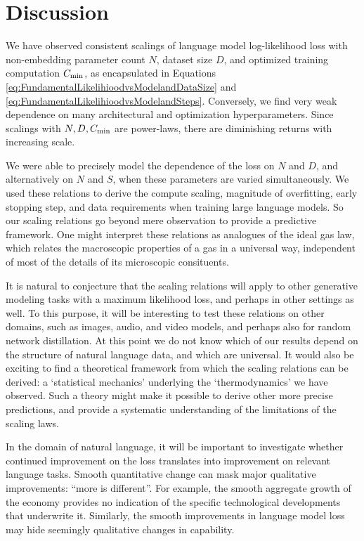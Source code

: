 \documentclass[english]{article}
\begin{document}
\section{Discussion}

We have observed consistent scalings of language model log-likelihood loss with non-embedding parameter count $N$, dataset size $D$, and optimized training computation $C_{\rm min}$, as encapsulated in Equations \eqref{eq:FundamentalLikelihioodvsModelandDataSize} and \eqref{eq:FundamentalLikelihioodvsModelandSteps}.  Conversely, we find very weak dependence on many architectural and optimization hyperparameters.  Since scalings with $N, D, C_{\rm min}$ are power-laws, there are diminishing returns with increasing scale.

We were able to precisely model the dependence of the loss on $N$ and $D$, and alternatively on $N$ and $S$, when these parameters are varied simultaneously.  We used these relations to derive the compute scaling, magnitude of overfitting, early stopping step, and data requirements when training large language models. So our scaling relations go beyond mere observation to provide a predictive framework.  One might interpret these relations as analogues of the ideal gas law, which relates the macroscopic properties of a gas in a universal way, independent of most of the details of its microscopic consituents.

It is natural to conjecture that the scaling relations will apply to other generative modeling tasks with a maximum likelihood loss, and perhaps in other settings as well.    To this purpose, it will be  interesting to test these relations on other domains, such as images, audio, and video models, and perhaps also for random network distillation.  At this point we do not know which of our results depend on the structure of natural language data, and which are universal.  It would also be exciting to find a theoretical framework from which the scaling relations can be derived: a `statistical mechanics' underlying the `thermodynamics' we have observed.  Such a theory might make it possible to derive other more precise predictions, and provide a systematic understanding of the limitations of the scaling laws.

In the domain of natural language, it will be important to investigate whether continued improvement on the loss translates into improvement on relevant language tasks.  Smooth quantitative change can mask major qualitative improvements: ``more is different''.  For example, the smooth aggregate growth of the economy provides no indication of the specific technological developments that underwrite it. Similarly, the smooth improvements in language model loss may hide seemingly qualitative changes in capability.
\end{document}
